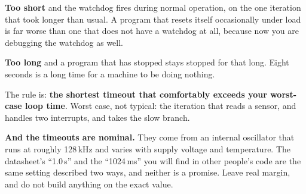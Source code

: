 \textbf{Too short} and the watchdog fires during normal operation, on the one iteration that took
longer than usual. A program that resets itself occasionally under load is far worse than one that
does not have a watchdog at all, because now you are debugging the watchdog as well.

\textbf{Too long} and a program that has stopped stays stopped for that long. Eight seconds is a
long time for a machine to be doing nothing.

The rule is: \textbf{the shortest timeout that comfortably exceeds your worst-case loop time}.
Worst case, not typical: the iteration that reads a sensor, and handles two interrupts, and takes
the slow branch.

\textbf{And the timeouts are nominal.} They come from an internal oscillator that runs at roughly
128\,kHz and varies with supply voltage and temperature. The datasheet's ``1.0\,s'' and the
``1024\,ms'' you will find in other people's code are the same setting described two ways, and
neither is a promise. Leave real margin, and do not build anything on the exact value.
